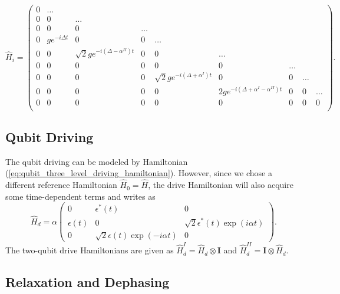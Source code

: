 \begin{equation}
\hat{H}_i = \left(
			\begin{array}{lllllllll}
				0 & \hdots \\
				0 & 0 & \hdots \\
				0 & 0 & 0 & \hdots \\
				0 & ge^{-i\Delta t} & 0 & 0 & \hdots  \\
				0 & 0 & \sqrt{2}ge^{-i(\Delta-\alpha^{II}) t} & 0 & 0 & \hdots  \\
				0 & 0 & 0 & 0 & 0 & 0 & \hdots \\
				0 & 0 & 0 & 0 & \sqrt{2}ge^{-i(\Delta+\alpha^I) t} & 0 & 0 & \hdots \\
				0 & 0 & 0 & 0 & 0 & 2ge^{-i(\Delta+\alpha^{I}-\alpha^{II}) t} & 0 & 0 & \hdots \\
				0 & 0 & 0 & 0 & 0 & 0 & 0 & 0 & 0 \\
			\end{array}
		\right).
\end{equation}
%
\subsection{Qubit Driving}
The qubit driving can be modeled by Hamiltonian (\ref{eq:qubit_three_level_driving_hamiltonian}). However, since we chose a different reference Hamiltonian $\hat{H}_0=\hat{H}$, the drive Hamiltonian will also acquire some time-dependent terms and writes as
%
\begin{equation}
\hat{H}_d = \alpha\left(
						 \begin{array}{ccc}
						0 & \epsilon^*(t) & 0 \\
						\epsilon(t) & 0 & \sqrt{2}\epsilon^*(t)\exp{\left(i\alpha t\right)} \\
						0 & \sqrt{2}\epsilon(t)\exp{\left(-i\alpha t\right)} & 0
						\end{array}
					\right). \label{eq:qubit_three_level_driving_hamiltonian_modified}
\end{equation}
%
The two-qubit drive Hamiltonians are given as $\hat{H}_d^I= \hat{H}_d\otimes \mathbf{I}$ and $\hat{H}_d^{II}=\mathbf{I}\otimes\hat{H}_d$.
\subsection{Relaxation and Dephasing}

